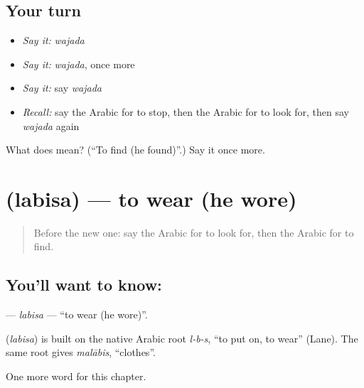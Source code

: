 \subsection*{Your turn}
\begin{itemize}
\raggedright
  \item \emph{Say it:} \emph{wajada}
  \item \emph{Say it:} \emph{wajada}, once more
  \item \emph{Say it:} say \emph{wajada}
  \item \emph{Recall:} say the Arabic for to stop, then the Arabic for to look for, then say \emph{wajada} again
\end{itemize}

\begin{tcolorbox}[breakable,colback=teal!4,colframe=teal!35!black,title={Before you move on}]
What does  mean? (\textquotedblleft{}To find (he found)\textquotedblright{}.) Say it once more.
\end{tcolorbox}
\section[\texorpdfstring{\ar{لبس} (labisa)}{لبس (labisa)}]{ (labisa) — to wear (he wore)}

\label{lesson:AR-C62-labisa}



\begin{quote}
Before the new one: say the Arabic for to look for, then the Arabic for to find.
\end{quote}

\subsection*{You'll want to know: }
\textbf{} — \emph{labisa} — \textquotedblleft{}to wear (he wore)\textquotedblright{}.

\begin{cousinweb}
\textbf{} (\emph{labisa}) is built on the native Arabic root \emph{l-b-s}, \textquotedblleft{}to put on, to wear\textquotedblright{} (Lane). The same root gives \emph{malābis}, \textquotedblleft{}clothes\textquotedblright{}.
\end{cousinweb}

\begin{grammarlens}[title={What you've built}]
One more word for this chapter.
\end{grammarlens}

